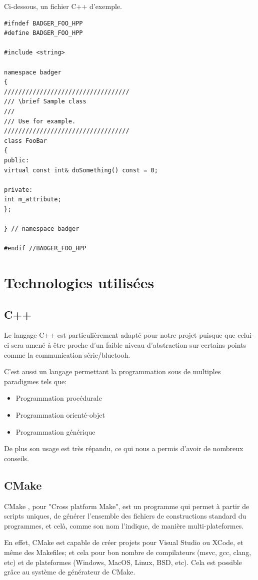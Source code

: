 Ci-dessous, un fichier C++ d'exemple.

\begin{lstlisting}
#ifndef BADGER_FOO_HPP
#define BADGER_FOO_HPP

#include <string>

namespace badger
{
///////////////////////////////////
/// \brief Sample class
///
/// Use for example.
///////////////////////////////////
class FooBar
{
public:
virtual const int& doSomething() const = 0;

private:
int m_attribute;
};

} // namespace badger

#endif //BADGER_FOO_HPP
\end{lstlisting}

    \section{Technologies utilisées}

        \subsection{C++}
Le langage C++ est particulièrement adapté pour notre projet puisque que celui-ci
sera amené à être proche d'un faible niveau d'abstraction sur certains points
comme la communication série/bluetooh.

C'est aussi un langage permettant la programmation sous de multiples paradigmes
tels que:

    \begin{itemize}
    \item Programmation procédurale
    \item Programmation orienté-objet
    \item Programmation générique
    \end{itemize}

De plus son usage est très répandu, ce qui nous a permis d'avoir de nombreux conseils.

        \subsection{CMake}
CMake \cite{cmake}, pour "Cross platform Make", est un programme qui permet à partir 
de scripts uniques, de générer l'ensemble des fichiers de constructions standard 
du programmes, et celà, comme son nom l'indique, de manière multi-plateformes.

En effet, CMake est capable de créer projets pour Visual Studio ou XCode, et même 
des Makefiles; et cela pour bon nombre de compilateurs (msvc, gcc, clang, etc) et 
de plateformes (Windows, MacOS, Linux, BSD, etc). Cela est possible grâce au
système de générateur de CMake.

